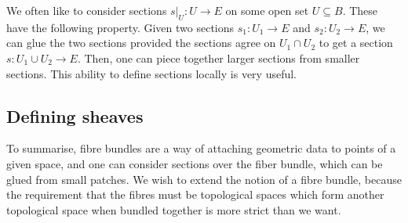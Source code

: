 We often like to consider sections $s\vert_U:U\to E$ on some open set
$U\subseteq B$. These have the following property.
Given two sections $s_{1}:U_{1}\to E$ and $s_{2}:U_{2}\to E$, we can 
glue the two sections provided the sections
agree on $U_{1}\cap U_{2}$ to get a section $s:U_{1}\cup U_{2}\to E$.
Then, one can piece together larger sections from smaller sections. This
ability to define sections locally is very useful.

\subsection{Defining sheaves}
To summarise, fibre bundles are a way of attaching geometric data to
points of a given space, and one can consider sections over the fiber
bundle, which can be glued from small patches. We wish to extend the notion
of a fibre bundle, because the requirement that the fibres must be
topological spaces which form another topological space when bundled
together is more strict than we want.

